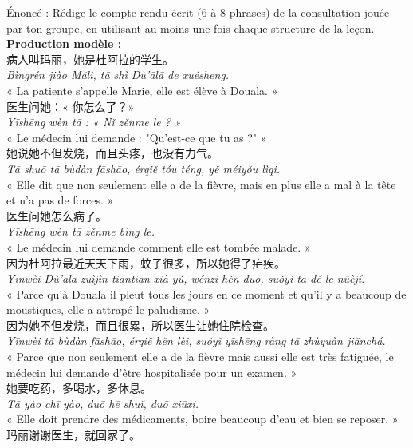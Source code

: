 \documentclass[11pt]{article}
\begin{document}
\begin{exoresolu}
Énoncé : Rédige le compte rendu écrit (6 à 8 phrases) de la consultation jouée par ton groupe, en utilisant au moins une fois chaque structure de la leçon.
\tcblower
\textbf{Production modèle :}\\[4pt]
病人叫玛丽，她是杜阿拉的学生。\\
\emph{Bìngrén jiào Mǎlì, tā shì Dù'ālā de xuésheng.}\\
« La patiente s'appelle Marie, elle est élève à Douala. »\\[4pt]
医生问她：« 你怎么了？»\\
\emph{Yīshēng wèn tā : « Nǐ zěnme le ? »}\\
« Le médecin lui demande : "Qu'est-ce que tu as ?" »\\[4pt]
她说她不但发烧，而且头疼，也没有力气。\\
\emph{Tā shuō tā bùdàn fāshāo, érqiě tóu téng, yě méiyǒu lìqi.}\\
« Elle dit que non seulement elle a de la fièvre, mais en plus elle a mal à la tête et n'a pas de forces. »\\[4pt]
医生问她怎么病了。\\
\emph{Yīshēng wèn tā zěnme bìng le.}\\
« Le médecin lui demande comment elle est tombée malade. »\\[4pt]
因为杜阿拉最近天天下雨，蚊子很多，所以她得了疟疾。\\
\emph{Yīnwèi Dù'ālā zuìjìn tiāntiān xià yǔ, wénzi hěn duō, suǒyǐ tā dé le nüèjí.}\\
« Parce qu'à Douala il pleut tous les jours en ce moment et qu'il y a beaucoup de moustiques, elle a attrapé le paludisme. »\\[4pt]
因为她不但发烧，而且很累，所以医生让她住院检查。\\
\emph{Yīnwèi tā bùdàn fāshāo, érqiě hěn lèi, suǒyǐ yīshēng ràng tā zhùyuàn jiǎnchá.}\\
« Parce que non seulement elle a de la fièvre mais aussi elle est très fatiguée, le médecin lui demande d'être hospitalisée pour un examen. »\\[4pt]
她要吃药，多喝水，多休息。\\
\emph{Tā yào chī yào, duō hē shuǐ, duō xiūxi.}\\
« Elle doit prendre des médicaments, boire beaucoup d'eau et bien se reposer. »\\[4pt]
玛丽谢谢医生，就回家了。\\

\end{exoresolu}
\end{document}
